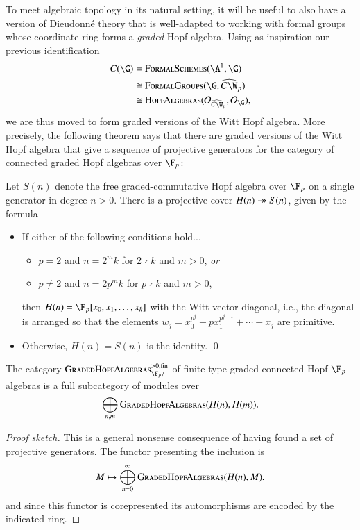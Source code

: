 To meet algebraic topology in its natural setting, it will be useful to also have a version of Dieudonn\'e theory that is well-adapted to working with formal groups whose coordinate ring forms a \emph{graded} Hopf algebra.  Using as inspiration our previous identification
\begin{align*}
C(\G) & = \CatOf{FormalSchemes}(\A^1, \G) \\
& \cong \CatOf{FormalGroups}(\G, \widehat{C\W}_p) \\
& \cong \CatOf{HopfAlgebras}(\sheaf O_{\widehat{C\W}_p}, \sheaf O_{\G}),
\end{align*}
we are thus moved to form graded versions of the Witt Hopf algebra.  More precisely, the following theorem says that there are graded versions of the Witt Hopf algebra that give a sequence of projective generators for the category of connected graded Hopf algebras over $\F_p$:

\begin{theorem}
Let $S(n)$ denote the free graded-commutative Hopf algebra over $\F_p$ on a single generator in degree $n > 0$.  There is a projective cover $H(n) \twoheadrightarrow S(n)$, given by the formula
\begin{itemize}
\item If either of the following conditions hold...
\begin{itemize}
\item $p = 2$ and $n = 2^m k$ for $2 \nmid k$ and $m > 0$, \emph{or}
\item $p \ne 2$ and $n = 2p^m k$ for $p \nmid k$ and $m > 0$,
\end{itemize}
then $H(n) = \F_p[x_0, x_1, \ldots, x_k]$ with the Witt vector diagonal, i.e., the diagonal is arranged so that the elements $w_j = x_0^{p^j} + p x_1^{p^{j-1}} + \cdots + x_j$ are primitive.
\item Otherwise, $H(n) = S(n)$ is the identity.
\qed
\end{itemize}
\end{theorem}

\begin{corollary}
The category $\CatOf{GradedHopfAlgebras}^{> 0, \fin}_{\F_p/}$ of finite-type graded connected Hopf $\F_p$--algebras is a full subcategory of modules over \[\bigoplus_{n, m} \normalfont\textsc{GradedHopfAlgebras}(H(n), H(m)).\]
\end{corollary}
\begin{proof}[Proof sketch]
This is a general nonsense consequence of having found a set of projective generators.  The functor presenting the inclusion is \[M \mapsto \bigoplus_{n=0}^\infty \normalfont\textsc{GradedHopfAlgebras}(H(n), M),\] and since this functor is corepresented its automorphisms are encoded by the indicated ring.
\end{proof}


